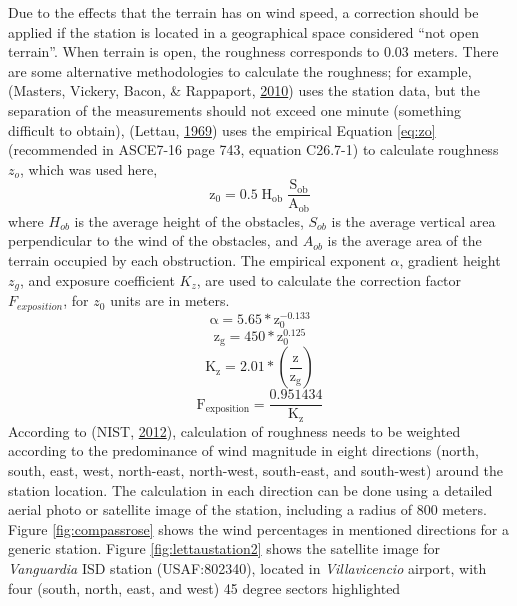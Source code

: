 \documentclass[12pt,twoside]{reedthesis}
\begin{document}
Due to the effects that the terrain has on wind speed, a correction should be applied if the station is located in a geographical space considered ``not open terrain''. When terrain is open, the roughness corresponds to 0.03 meters. There are some alternative methodologies to calculate the roughness; for example, (Masters, Vickery, Bacon, \& Rappaport, \protect\hyperlink{ref-Masters2010}{2010}) uses the station data, but the separation of the measurements should not exceed one minute (something difficult to obtain), (Lettau, \protect\hyperlink{ref-Lettau1969}{1969}) uses the empirical Equation \eqref{eq:zo} (recommended in ASCE7-16 page 743, equation C26.7-1) to calculate roughness \(z_o\), which was used here,
\begin{equation}
\mathrm{
        z_0= 0.5\;H_{ob}\;\frac{S_{ob}}{A_{ob}}
       }
  \label{eq:zo}
\end{equation}
where \(H_{ob}\) is the average height of the obstacles, \(S_{ob}\) is the average vertical area perpendicular to the wind of the obstacles, and \(A_{ob}\) is the average area of the terrain occupied by each obstruction. The empirical exponent \(\alpha\), gradient height \(z_g\), and exposure coefficient \(K_z\), are used to calculate the correction factor \(F_{exposition}\), for \(z_0\) units are in meters.
\begin{equation}
\mathrm{
        \alpha =  5.65*z_0^{-0.133}
       }
  \label{eq:alpha}
\end{equation}
\begin{equation}
\mathrm{
        z_g=450*z_0^{0.125}
       }
  \label{eq:zg}
\end{equation}
\begin{equation}
\mathrm{
        K_z= 2.01*\left(\frac{z}{z_g}\right)
       }
  \label{eq:kz}
\end{equation}
\begin{equation}
\mathrm{
        F_{exposition} = \frac{0.951434}{K_z}
       }
  \label{eq:fexpo}
\end{equation}
According to (NIST, \protect\hyperlink{ref-nist2012}{2012}), calculation of roughness needs to be weighted according to the predominance of wind magnitude in eight directions (north, south, east, west, north-east, north-west, south-east, and south-west) around the station location. The calculation in each direction can be done using a detailed aerial photo or satellite image of the station, including a radius of 800 meters. Figure \ref{fig:compassrose} shows the wind percentages in mentioned directions for a generic station. Figure \ref{fig:lettaustation2} shows the satellite image for \emph{Vanguardia} ISD station (USAF:802340), located in \emph{Villavicencio} airport, with four (south, north, east, and west) 45 degree sectors highlighted
\end{document}
